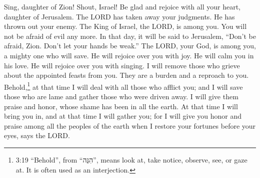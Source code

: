 \myverse{}Sing, daughter of Zion! Shout, Israel! Be glad and rejoice with
all your heart, daughter of Jerusalem. \myverse{}The LORD has taken away your judgments. He has thrown out your enemy. The King of Israel, the LORD, is among you. You will not be afraid of evil any more. \myverse{}In that day, it will be said to Jerusalem, “Don’t be afraid, Zion. Don’t let your hands be weak.” \myverse{}The LORD, your God, is among you, a mighty one who will save. He will rejoice over you with joy. He will calm you in his love. He will rejoice over you with singing. \myverse{}I will remove those who grieve about the appointed feasts from you. They are a burden and a reproach to you. \myverse{}Behold,\footnote{3:19 “Behold”, from “הִנֵּה”, means look at, take notice, observe, see, or gaze at. It is often used as an interjection.} at that time I will deal with all those who afflict you; and I will save those who are lame and gather those who were driven away. I will give them praise and honor, whose shame has been in all the earth. \myverse{}At that time I will bring you in, and at that time I will gather you; for I will give you honor and praise among all the peoples of the earth when I restore your fortunes before your eyes, says the LORD.


